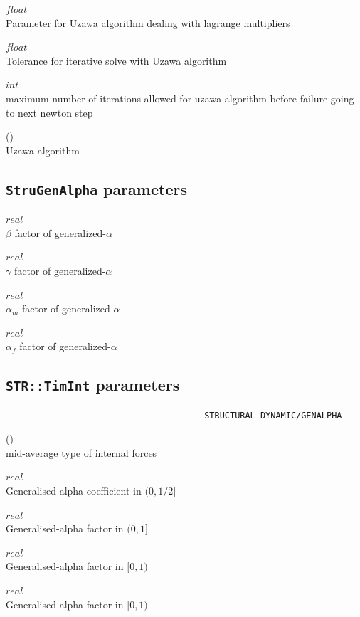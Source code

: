  $float$\\
Parameter for Uzawa algorithm dealing with lagrange multipliers

 $float$\\
Tolerance for iterative solve with Uzawa algorithm

 $int$\\
maximum number of iterations allowed for uzawa algorithm before failure going to next newton step

 (\kor{})\\
Uzawa algorithm

\subsection{\baci{} \texttt{StruGenAlpha}  parameters}

 $real$\\
$\beta$ factor of generalized-$\alpha$

 $real$\\
$\gamma$ factor of generalized-$\alpha$

 $real$\\
$\alpha_m$ factor of generalized-$\alpha$

 $real$\\
$\alpha_f$ factor of generalized-$\alpha$

\subsection{\baci{} \texttt{STR::TimInt} parameters}

\begin{verbatim}
---------------------------------------STRUCTURAL DYNAMIC/GENALPHA
\end{verbatim}

 (\kor{})\\
mid-average type of internal forces

 $real$\\
Generalised-alpha coefficient in $(0,1/2]$

 $real$\\
Generalised-alpha factor in $(0,1]$

 $real$\\
Generalised-alpha factor in $[0,1)$

 $real$\\
Generalised-alpha factor in $[0,1)$

